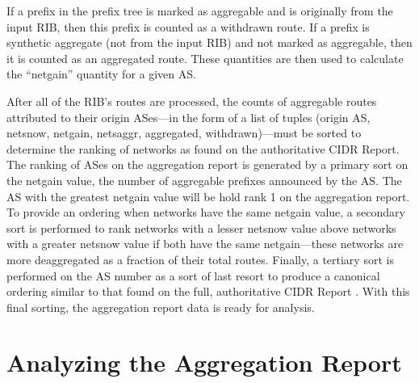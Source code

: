 If a prefix in the prefix tree is marked as aggregable and is originally from the input RIB, then this prefix is counted as a withdrawn route. If a prefix is synthetic aggregate (not from the input RIB) and not marked as aggregable, then it is counted as an aggregated route. These quantities are then used to calculate the ``netgain'' quantity for a given AS.

After all of the RIB's routes are processed, the counts of aggregable routes attributed to their origin ASes---in the form of a list of tuples (origin AS, netsnow, netgain, netsaggr, aggregated, withdrawn)---must be sorted to determine the ranking of networks as found on the authoritative CIDR Report. The ranking of ASes on the aggregation report is generated by a primary sort on the netgain value, the number of aggregable prefixes announced by the AS. The AS with the greatest netgain value will be hold rank 1 on the aggregation report. To provide an ordering when networks have the same netgain value, a secondary sort is performed to rank networks with a lesser netsnow value above networks with a greater netsnow value if both have the same netgain---these networks are more deaggregated as a fraction of their total routes. Finally, a tertiary sort is performed on the AS number as a sort of last resort to produce a canonical ordering similar to that found on the full, authoritative CIDR Report \cite{cidr-report-full}. With this final sorting, the aggregation report data is ready for analysis.

\section{Analyzing the Aggregation Report}







